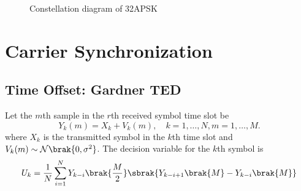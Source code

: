 \documentclass[journal,12pt,twocolumn]{IEEEtran}
\begin{document}
\begin{figure}[!ht]
\begin{center}
\resizebox{\columnwidth}{!}{}
\end{center}
\caption{Constellation diagram of 32APSK}
\label{fig:32apsk}
\end{figure}

\section{Carrier Synchronization}
\subsection{Time Offset: Gardner TED}
%
Let the $m$th sample in the $r$th received symbol time slot be
\begin{equation}
Y_k(m)= X_k + V_k(m), \quad k = 1,\dots,N, m = 1 ,\dots,M.
\end{equation} 
where $X_k$ is the transmitted symbol in the $k$th time slot and $V_k(m) \sim \mathcal{N}\brak{0,\sigma^2} $. 
The decision variable for the $k$th symbol 
is 
\cite{time_offset}
\begin{align}
U_k=\frac{1}{N}\sum^{N}_{i=1}Y_{k-i}\brak{\frac{M}{2}}\sbrak{Y_{k-i+1}\brak{M}-Y_{k-i}\brak{M}}
\end{align}
%
\end{document}

